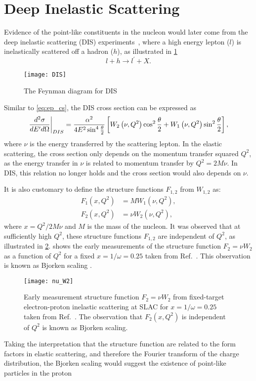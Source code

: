 \documentclass[../main.tex]{subfiles}
\begin{document}
\section{Deep Inelastic Scattering}
\label{sec:dis}
Evidence of the point-like constituents in the nucleon would later come from the deep
inelastic scattering (DIS) experiments~\cite{breidenbach1969}, where a high
energy lepton ($l$) is inelastically scattered off a hadron ($h$), as
illustrated in \cref{fig:DIS}
\begin{equation}
	l + h \rightarrow l^\prime + X.
\end{equation}
\begin{figure}[htbp!]
	\centering
	\texttt{[image: DIS]}
	\caption{The Feynman diagram for DIS}
	\label{fig:DIS}
\end{figure}
Similar to \cref{eq:ep_cs}, the DIS cross section can be expressed as
\begin{equation}
	\eval{\frac{d^2\sigma}{dE^\prime d\Omega}}_{DIS} = \frac{\alpha^2}{4E^2 \sin^4
		\frac{\theta}{2}} \left[ W_2\left(\nu,Q^2\right)\cos^2
		\frac{\theta}{2} + W_1\left(\nu,Q^2\right)\sin^2 \frac{\theta}{2}
		\right],
	\label{eq:DIS_cs1}
\end{equation}
where $\nu$ is the energy transferred by the scattering lepton.
In the elastic scattering, the cross section only depends on the momentum transfer squared $Q^2$,
as the energy transfer in $\nu$ is related to momentum transfer by $Q^2=2M\nu$.
In DIS, this relation no longer holds and the cross section would also depends on $\nu$.

It is also customary to define the structure functions $F_{1,2}$ from $W_{1,2}$ as:
\begin{equation}
	\begin{split}
		F_1\left(x,Q^2\right) &= MW_1\left(\nu,Q^2\right),\\
		F_2\left(x,Q^2\right) &= \nu W_2\left(\nu,Q^2\right),
	\end{split}
\end{equation}
where $x=Q^2/2M\nu$ and $M$ is the mass of the nucleon. It was observed that at sufficiently high $Q^2$,
these structure functions $F_{1,2}$ are independent of $Q^2$, as illustrated in
\cref{fig:w2}.  shows the early measurements of the
structure function $F_2=\nu W_2$ as a function of $Q^2$ for a fixed
$x=1/\omega=0.25$ taken from Ref.~\cite{friedman1972}. This observation is
known as Bjorken scaling \cite{bjorken1969}.
\begin{figure}[htpb!]
	\centering
	\texttt{[image: nu\_W2]}
	\caption{Early measurement structure function $F_2=\nu W_2$ from
		fixed-target electron-proton inelastic scattering at SLAC for
		$x=1/\omega=0.25$ taken from Ref.~\cite{friedman1972}. The observation
		that $F_2(x,Q^2)$ is independent of $Q^2$ is known as Bjorken scaling. }
	\label{fig:w2}
\end{figure}
Taking the interpretation that the structure function are related to the form factors in elastic scattering,
and therefore the Fourier transform of the charge distribution, the Bjorken scaling would suggest
the existence of point-like particles in the proton
\end{document}
